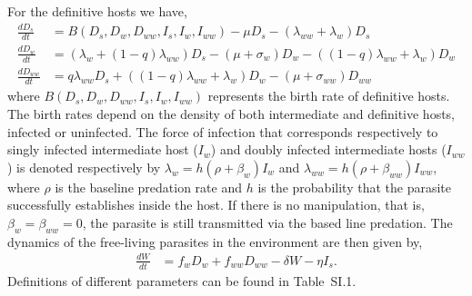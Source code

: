 \documentclass[a4paper]{scrartcl}
\begin{document}
For the definitive hosts we have,
%
\begin{align}
\frac{dD_s}{dt} &= B(D_s,  D_w,  D_{ww},  I_s, I_w, I_{ww})  - \mu D_s - (\lambda_{ww} + \lambda_w) D_s \nonumber \\    
\frac{dD_w}{dt} &= (\lambda_w + (1 - q) \lambda_{ww}) D_s - (\mu + \sigma_w) D_w - ((1 - q) \lambda_{ww} + \lambda_w) D_w  \label{odes:dhosts} \\         
\frac{dD_{ww}}{dt} &= q \lambda_{ww} D_s + ((1 - q) \lambda_{ww} + \lambda_w) D_w - (\mu + \sigma_{ww}) D_{ww} \nonumber
\end{align}
%
where $B(D_s, D_w, D_{ww}, I_s, I_w, I_{ww})$ represents the birth rate of definitive hosts.
The birth rates depend on the density of both intermediate and definitive hosts, infected or uninfected. 
The force of infection that corresponds respectively to singly infected intermediate host ($I_w$) and doubly infected intermediate hosts ($I_{ww}$) is denoted respectively by $\lambda_w = h (\rho + \beta_w)  I_w$ and $\lambda_{ww} = h (\rho + \beta_{ww}) I_{ww}$, where $\rho$ is the baseline predation rate and $h$ is the probability that the parasite successfully establishes inside the host.
If there is no manipulation, that is, $\beta_w = \beta_{ww} = 0$, the parasite is still transmitted via the based line predation. 
The dynamics of the free-living parasites in the environment are then given by,
\begin{align}
	\frac{dW}{dt} &= f_w D_w + f_{ww} D_{ww} - \delta W - \eta I_s. \label{odes:eparasite}
\end{align}
%
Definitions of different parameters can be found in Table~SI.1.%
\end{document}
